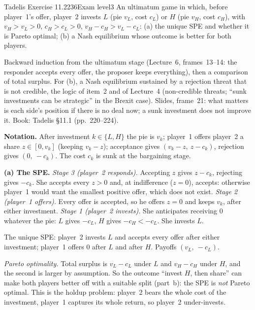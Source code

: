 \begin{exsol}{Tadelis Exercise 11.2}{236}{Exam level}{3}
\asked An ultimatum game in which, before player~1's offer, player~2 invests $L$ (pie $v_L$, cost
$c_L$) or $H$ (pie $v_H$, cost $c_H$), with $v_H > v_L > 0$, $c_H > c_L > 0$, $v_H - c_H > v_L - c_L$:
(a) the unique SPE and whether it is Pareto optimal; (b) a Nash equilibrium whose outcome is better
for both players.

\method Backward induction from the ultimatum stage (Lecture~6, frames~13--14: the responder accepts
every offer, the proposer keeps everything), then a comparison of total surplus. For (b), a Nash
equilibrium sustained by a rejection threat that is not credible, the logic of item~2 and of
Lecture~4 (non-credible threats; ``sunk investments can be strategic'' in the Brexit case). Slides,
frame~21: what matters is each side's position if there is no deal now; a sunk investment does not
improve it. Book: Tadelis \S11.1 (pp.~220--224).

\solution
\textbf{Notation.} After investment $k \in \{L,H\}$ the pie is $v_k$; player~1 offers player~2 a share
$z \in [0, v_k]$ (keeping $v_k - z$); acceptance gives $(v_k - z,\ z - c_k)$, rejection gives
$(0,\ -c_k)$. The cost $c_k$ is sunk at the bargaining stage.

\textbf{(a) The SPE.}
\emph{Stage 3 (player~2 responds).} Accepting $z$ gives $z - c_k$, rejecting gives $-c_k$. She accepts
every $z > 0$ and, at indifference ($z = 0$), accepts: otherwise player~1 would want the smallest
positive offer, which does not exist.
\emph{Stage 2 (player~1 offers).} Every offer is accepted, so he offers $z = 0$ and keeps $v_k$, after
either investment.
\emph{Stage 1 (player~2 invests).} She anticipates receiving $0$ whatever the pie: $L$ gives $-c_L$,
$H$ gives $-c_H < -c_L$. She invests $L$.

The unique SPE: player~2 invests $L$ and accepts every offer after either investment; player~1 offers
$0$ after $L$ and after $H$. Payoffs $(v_L,\ -c_L)$.

\emph{Pareto optimality.} Total surplus is $v_L - c_L$ under $L$ and $v_H - c_H$ under $H$, and the
second is larger by assumption. So the outcome ``invest $H$, then share'' can make both players better
off with a suitable split (part~b): the SPE is \emph{not} Pareto optimal. This is the holdup problem:
player~2 bears the whole cost of the investment, player~1 captures its whole return, so player~2
under-invests.


\end{exsol}
